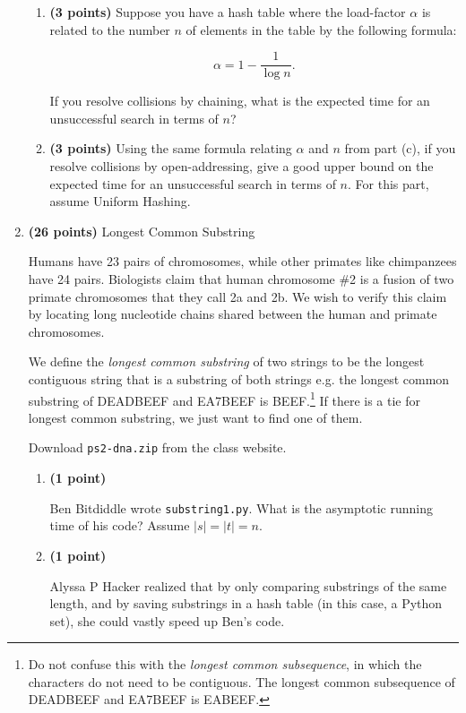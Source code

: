 \documentclass[12pt,twoside]{article}
\begin{document}
\begin{enumerate}
\begin{enumerate}
  \item {\bf (3 points)} Suppose you have a hash table where the
    load-factor $\alpha$ is related to the number $n$ of elements in the
    table by the following formula:
    
    \[
    \alpha = 1- \frac{1}{\log{n}}.
    \]
      
    If you resolve collisions by chaining, what is the expected time
    for an unsuccessful search in terms of $n$?

  \item {\bf (3 points)} Using the same formula relating $\alpha$ and
    $n$ from part (c), if you resolve collisions by open-addressing,
    give a good upper bound on the expected time for an unsuccessful
    search in terms of $n$. For this part, assume Uniform Hashing.

  \end{enumerate}

\item {\bf (26 points)} Longest Common Substring
  
  Humans have 23 pairs of chromosomes, while other primates like
  chimpanzees have 24 pairs. Biologists claim that human chromosome
  \#2 is a fusion of two primate chromosomes that they call 2a and
  2b. We wish to verify this claim by locating long nucleotide chains
  shared between the human and primate chromosomes.

  We define the \emph{longest common substring} of two strings to be
  the longest contiguous string that is a substring of both strings
  e.g. the longest common substring of DEADBEEF and EA7BEEF is
  BEEF.\footnote{Do not confuse this with the \emph{longest common
  subsequence}, in which the characters do not need to be
  contiguous. The longest common subsequence of DEADBEEF and EA7BEEF
  is EABEEF.} If there is a tie for longest common substring, we just
  want to find one of them.
  
  Download \texttt{ps2-dna.zip} from the class website.

  \begin{enumerate}
  \item {\bf (1 point)}

    Ben Bitdiddle wrote \texttt{substring1.py}. What is the asymptotic
    running time of his code? Assume $|s| = |t| = n$.

  \item {\bf (1 point)}

    Alyssa P Hacker realized that by only comparing substrings of the
    same length, and by saving substrings in a hash table (in this
    case, a Python set), she could vastly speed up Ben's code.


\end{enumerate}
\end{enumerate}
\end{document}
